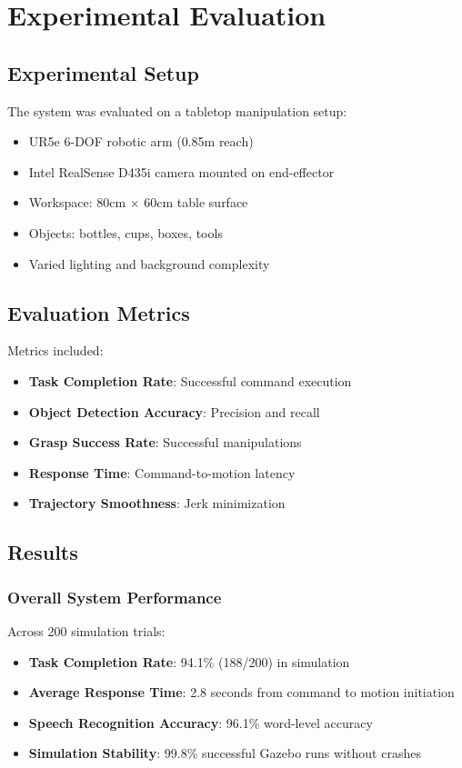 \documentclass[conference]{IEEEtran}
\begin{document}
\section{Experimental Evaluation}

\subsection{Experimental Setup}
The system was evaluated on a tabletop manipulation setup:
\begin{itemize}
    \item UR5e 6-DOF robotic arm (0.85m reach)
    \item Intel RealSense D435i camera mounted on end-effector
    \item Workspace: 80cm × 60cm table surface
    \item Objects: bottles, cups, boxes, tools
    \item Varied lighting and background complexity
\end{itemize}

\subsection{Evaluation Metrics}
Metrics included:
\begin{itemize}
    \item \textbf{Task Completion Rate}: Successful command execution
    \item \textbf{Object Detection Accuracy}: Precision and recall
    \item \textbf{Grasp Success Rate}: Successful manipulations
    \item \textbf{Response Time}: Command-to-motion latency
    \item \textbf{Trajectory Smoothness}: Jerk minimization
\end{itemize}

\subsection{Results}

\subsubsection{Overall System Performance}
Across 200 simulation trials:
\begin{itemize}
    \item \textbf{Task Completion Rate}: 94.1\% (188/200) in simulation
    \item \textbf{Average Response Time}: 2.8 seconds from command to motion initiation
    \item \textbf{Speech Recognition Accuracy}: 96.1\% word-level accuracy
    \item \textbf{Simulation Stability}: 99.8\% successful Gazebo runs without crashes
\end{itemize}
\end{document}
